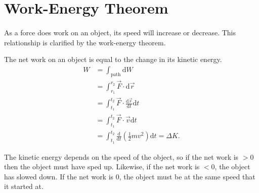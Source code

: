 \documentclass[../classical_mechanics.tex]{subfiles}
\begin{document}
    \section{Work-Energy Theorem}\label{sec:work-energy-theorem}
        \paragraph{}
        As a force does work on an object, its speed will increase or decrease.
        This relationship is clarified by the work-energy theorem.
        \begin{theorem}
            The net work on an object is equal to the change in its kinetic energy.
            \begin{align}
                W&=\int_\mathrm{path}\mathrm{d}W\\
                &=\int_{r_1}^{r_2}\vec{F}\cdot\mathrm{d}\vec{r}\\
                &=\int_{t_1}^{t_2}\vec{F}\cdot\frac{\mathrm{d}\vec{r}}{\mathrm{d}t}\mathrm{d}t\\
                &=\int_{t_1}^{t_2}\vec{F}\cdot\vec{v}\mathrm{d}t\\
                &=\int_{t_1}^{t_2}\frac{\mathrm{d}}{\mathrm{d}t}\left(\frac{1}{2}mv^2\right)\mathrm{d}t=\Delta K.
            \end{align}
        \end{theorem}
        The kinetic energy depends on the speed of the object, so if the net work is $>0$ then the object must have sped up.
        Likewise, if the net work is $<0$, the object has slowed down.
        If the net work is 0, the object must be at the same speed that it started at.
\end{document}
